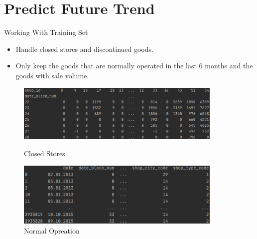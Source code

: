 \documentclass[
 size=14pt,
 paper=smartboard,  %
 mode=present, 		%
 display=slides, 	%
 style=tuliplab,  	%
 pauseslide,
 fleqn,leqno]{powerdot}
\begin{document}
\section{Predict Future Trend}
\begin{slide}{Working With Training Set}
\begin{itemize}
  \item Handle closed stores and discontinued goods.
  \item Only keep the goods that are normally operated in the last 6 months 
  and the goods with sale volume.

\end{itemize}
\begin{figure}[htbp]
  \centering
  \begin{minipage}[t]{0.48\textwidth}
    \centering
    \includegraphics[width=0.88\textwidth]{logos/close.eps}
    \vspace{0.4em}
    \caption{Closed Stores}
  \end{minipage}
  \begin{minipage}[t]{0.48\textwidth}
    \centering
    \includegraphics[width=0.88\textwidth]{logos/normal.eps}
    \vspace{0.4em}
    \caption{Normal Opreation}
  \end{minipage}
\end{figure}

\end{slide}
\end{document}
